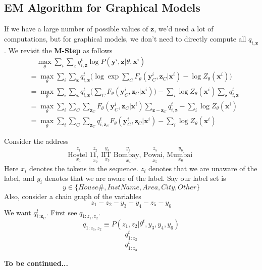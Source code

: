 \subsection{EM Algorithm for Graphical Models}
If we have a large number of possible values of $\mathbf z$, we'd need a lot of computations, but for graphical models, we don't need to directly compute all $q_{i, \mathbf z}$. We revisit the \textbf{M-Step} as follows
\begin{align*}
&\quad\max_{\theta}\sum_i \sum_z q_{i, \mathbf z}^t \log P(\mathbf y^i, \mathbf z|\theta, \mathbf x^i) \\
&= \max_\theta \sum_i\sum_\mathbf{z} q_{i, \mathbf z}^t \bigg(\log \exp\sum_C F_\theta(\mathbf y_C^i, \mathbf z_C| \mathbf x^i) - \log Z_\theta(\mathbf x^i)\bigg) \\
&= \max_\theta  \sum_i\sum_\mathbf{z} q_{i, \mathbf z}^t\bigg(\sum_C F_\theta(\mathbf y_C^i, \mathbf z_C| \mathbf x^i)\bigg) - \sum_i\log Z_\theta(\mathbf x^i) \sum_\mathbf{z} q_{i, \mathbf z}^t  \\
&=\max_\theta \sum_i \sum_C \sum_{\mathbf z_C} F_\theta(\mathbf y_C^i, \mathbf z_C| \mathbf x^i)\sum_{\mathbf{z-z}_C} q_{i, \mathbf z}^t - \sum_i \log Z_\theta(\mathbf x^i) \\
&=\max_\theta \sum_i \sum_C \sum_{\mathbf z_C} q_{i, \mathbf z_C}^tF_\theta(\mathbf y_C^i, \mathbf z_C| \mathbf x^i) - \sum_i \log Z_\theta(\mathbf x^i)
\end{align*}
\begin{exmp}
Consider the address
\[
\underset{x_1}{\overset{z_1}{\text{Hostel }}}
\underset{x_2}{\overset{z_2}{\text{11, }}}
\underset{x_3}{\overset{y_3}{\text{IIT }}}
\underset{x_4}{\overset{y_4}{\text{Bombay, }}}
\underset{x_5}{\overset{z_5}{\text{Powai, }}}
\underset{x_6}{\overset{y_6}{\text{Mumbai }}}
\]
Here $x_i$ denotes the tokens in the sequence. $z_i$ denotes that we are unaware of the label, and $y_i$ denotes that we are aware of the label. Say our label set is
\[y \in \{House\#, InstName, Area, City, Other\}\]
Also, consider a chain graph of the variables
\[z_1 - z_2 - y_3 - y_4 - z_5 - y_6\]
We want $q_{i:\mathbf z_C}^t$. First see $q_{1:z_1, z_2}$.
\[
q_{1:z_1, z_2} \equiv P(z_1, z_2 | \theta^t, y_3, y_4, y_6)
\]
\[
q^t_{1:z_2}
\]
\[
q^t_{1:z_3}
\]
\end{exmp}
\textbf{To be continued...}